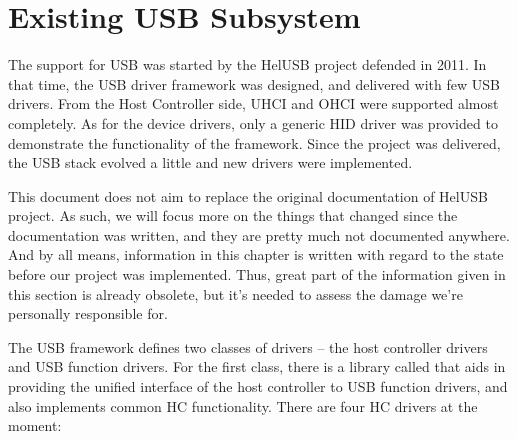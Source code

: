

\section{Existing USB Subsystem}

The support for USB was started by the HelUSB project defended in 2011. In that
time, the USB driver framework was designed, and delivered with few USB
drivers. From the Host Controller side, UHCI and OHCI were supported almost
completely. As for the device drivers, only a generic HID driver was provided
to demonstrate the functionality of the framework. Since the project was
delivered, the USB stack evolved a little and new drivers were implemented.

This document does not aim to replace the original documentation of HelUSB
project. As such, we will focus more on the things that changed since the
documentation was written, and they are pretty much not documented anywhere.
And by all means, information in this chapter is written with regard to the
state before our project was implemented. Thus, great part of the information
given in this section is already obsolete, but it's needed to assess the damage
we're personally responsible for.

The USB framework defines two classes of drivers -- the host controller drivers
and USB function drivers. For the first class, there is a library called
 that aids in providing the unified interface of the host
controller to USB function drivers, and also implements common HC
functionality. There are four HC drivers at the moment:

